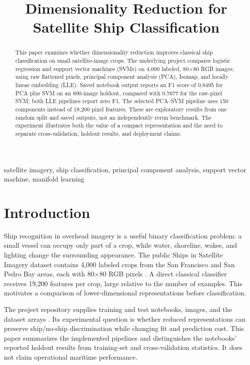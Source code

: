 \documentclass[conference]{IEEEtran}
\begin{document}
\title{Dimensionality Reduction for Satellite Ship Classification}
\author{}
\maketitle
\begin{abstract}
This paper examines whether dimensionality reduction improves classical ship classification on small satellite-image crops. The underlying project compares logistic regression and support vector machines (SVMs) on 4,000 labeled, 80$\times$80 RGB images, using raw flattened pixels, principal component analysis (PCA), Isomap, and locally linear embedding (LLE). Saved notebook output reports an F1 score of 0.8495 for PCA plus SVM on an 800-image holdout, compared with 0.7677 for the raw-pixel SVM; both LLE pipelines report zero F1. The selected PCA--SVM pipeline uses 150 components instead of 19,200 pixel features. These are exploratory results from one random split and saved outputs, not an independently rerun benchmark. The experiment illustrates both the value of a compact representation and the need to separate cross-validation, holdout results, and deployment claims.
\end{abstract}
\begin{IEEEkeywords}
satellite imagery, ship classification, principal component analysis, support vector machine, manifold learning
\end{IEEEkeywords}

\section{Introduction}
Ship recognition in overhead imagery is a useful binary classification problem: a small vessel can occupy only part of a crop, while water, shoreline, wakes, and lighting change the surrounding appearance. The public Ships in Satellite Imagery dataset contains 4,000 labeled crops from the San Francisco and San Pedro Bay areas, each with 80$\times$80 RGB pixels \cite{dataset}. A direct classical classifier receives 19,200 features per crop, large relative to the number of examples. This motivates a comparison of lower-dimensional representations before classification.

The project repository supplies training and test notebooks, images, and the dataset arrays \cite{repo}. Its experimental question is whether reduced representations can preserve ship/no-ship discrimination while changing fit and prediction cost. This paper summarizes the implemented pipelines and distinguishes the notebooks' reported holdout results from training-set and cross-validation statistics. It does not claim operational maritime performance.
\end{document}
